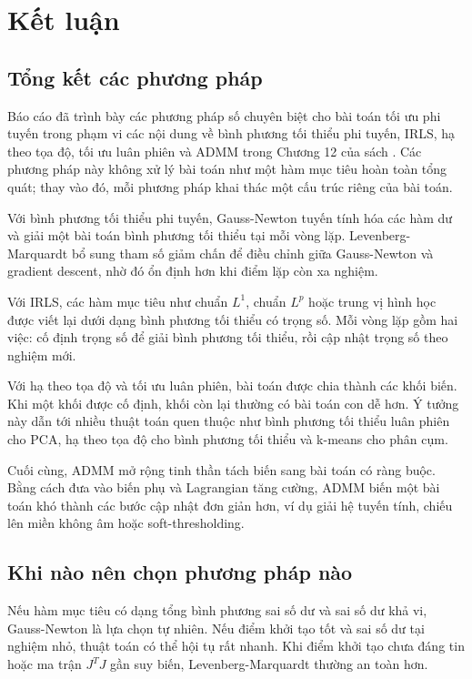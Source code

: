 
\section{Kết luận}
\label{SEC_ket_luan}

\subsection{Tổng kết các phương pháp}
\label{SUB_SEC_tong_ket_phuong_phap}
Báo cáo đã trình bày các phương pháp số chuyên biệt cho bài toán tối ưu phi tuyến  trong phạm vi các nội dung về bình phương tối thiểu phi tuyến, IRLS, hạ theo tọa độ, tối ưu luân phiên và ADMM trong Chương 12 của sách \cite{Solomon2015NumericalAlgorithms}. Các phương pháp này không xử lý bài toán như một hàm mục tiêu hoàn toàn tổng quát; thay vào đó, mỗi phương pháp khai thác một cấu trúc riêng của bài toán.
\medskip

Với bình phương tối thiểu phi tuyến, Gauss-Newton tuyến tính hóa các hàm dư và giải một bài toán bình phương tối thiểu tại mỗi vòng lặp. Levenberg-Marquardt bổ sung tham số giảm chấn để điều chỉnh giữa Gauss-Newton và gradient descent, nhờ đó ổn định hơn khi điểm lặp còn xa nghiệm.
\medskip

Với IRLS, các hàm mục tiêu như chuẩn $L^1$, chuẩn $L^p$ hoặc trung vị hình học được viết lại dưới dạng bình phương tối thiểu có trọng số. Mỗi vòng lặp gồm hai việc: cố định trọng số để giải bình phương tối thiểu, rồi cập nhật trọng số theo nghiệm mới.
\medskip

Với hạ theo tọa độ và tối ưu luân phiên, bài toán được chia thành các khối biến. Khi một khối được cố định, khối còn lại thường có bài toán con dễ hơn. Ý tưởng này dẫn tới nhiều thuật toán quen thuộc như bình phương tối thiểu luân phiên cho PCA, hạ theo tọa độ cho bình phương tối thiểu và k-means cho phân cụm.
\medskip

Cuối cùng, ADMM mở rộng tinh thần tách biến sang bài toán có ràng buộc. Bằng cách đưa vào biến phụ và Lagrangian tăng cường, ADMM biến một bài toán khó thành các bước cập nhật đơn giản hơn, ví dụ giải hệ tuyến tính, chiếu lên miền không âm hoặc soft-thresholding.

\subsection{Khi nào nên chọn phương pháp nào}
\label{SUB_SEC_chon_phuong_phap}
Nếu hàm mục tiêu có dạng tổng bình phương sai số dư và sai số dư khả vi, Gauss-Newton là lựa chọn tự nhiên. Nếu điểm khởi tạo tốt và sai số dư tại nghiệm nhỏ, thuật toán có thể hội tụ rất nhanh. Khi điểm khởi tạo chưa đáng tin hoặc ma trận $J^{T}J$ gần suy biến, Levenberg-Marquardt thường an toàn hơn.
\medskip

